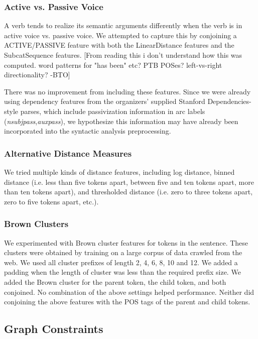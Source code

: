 \documentclass[11pt]{article}
\newcommand{\bocomment}[1]{\textcolor{Bittersweet}{[#1 -BTO]}}
\begin{document}
\subsubsection{Active vs. Passive Voice}
A verb tends to realize its semantic arguments differently when the verb is in
active voice vs. passive voice.
We attempted to capture this by conjoining a ACTIVE/PASSIVE feature with both
the LinearDistance features and the SubcatSequence features.
\bocomment{From reading this i don't understand how this was computed. word patterns for "has been" etc? PTB POSes? left-vs-right directionality?}

There was no improvement from including these features.
Since we were already using dependency features from the 
organizers' supplied Stanford Dependencies-style parses,
which include passivization information in arc labels (\emph{nsubjpass},\emph{auxpass}),
we hypothesize this information may have already been incorporated into the syntactic analysis preprocessing.

\subsubsection{Alternative Distance Measures}
We tried multiple kinds of distance features, including log distance, binned
distance (i.e. less than five tokens apart, between five and ten tokens apart, more than
ten tokens apart), and thresholded distance (i.e. zero to three tokens apart,
zero to five tokens apart, etc.).

\subsubsection{Brown Clusters}
We experimented with Brown cluster features \cite{Brown:1992:CNG:176313.176316}
for tokens in the sentence.
These clusters were obtained by training on a large corpus of data crawled from
the web.
We used all cluster prefixes of length 2, 4, 6, 8, 10 and 12.
We added a padding when the length of cluster was less than the required prefix
size.
We added the Brown cluster for the parent token, the child token, and both
conjoined.
No combination of the above settings helped performance.
Neither did conjoining the above features with the POS tags of the parent and
child tokens.

\subsection{Graph Constraints}
\label{s:badconstraints}
\end{document}

